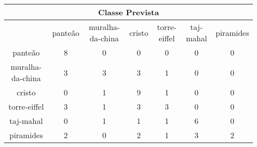 \begin{tabular}{|c|c|c|c|c|c|c|}
\hline
\multicolumn{7}{|c|}{Classe Prevista}\\
\hline
 & panteão & muralha-da-china & cristo & torre-eiffel & taj-mahal & piramides\\
panteão & 8 & 0 & 0 & 0 & 0 & 0\\
muralha-da-china & 3 & 3 & 3 & 1 & 0 & 0\\
cristo & 0 & 1 & 9 & 1 & 0 & 0\\
torre-eiffel & 3 & 1 & 3 & 3 & 0 & 0\\
taj-mahal & 0 & 1 & 1 & 1 & 6 & 0\\
piramides & 2 & 0 & 2 & 1 & 3 & 2\\
\hline
\end{tabular}
